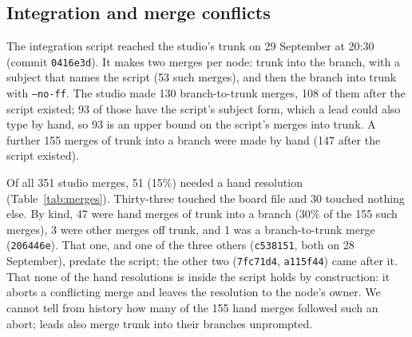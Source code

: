 \documentclass[11pt]{article}
\newcommand{\code}[1]{\texttt{#1}}
\begin{document}
\subsection{Integration and merge conflicts}

The integration script reached the studio's trunk on 29 September at 20:30 (commit %
\code{0416e3d}). It makes two merges per node: trunk into the branch, with a subject that
names the script (53 such merges), and then the branch into trunk with \code{--no-ff}. %
The studio made 130 branch-to-trunk merges, 108 of them after the script existed; 93 of %
those have the script's subject form, which a lead could also type by hand, so 93 is an
upper bound on the script's merges into trunk. A further 155 merges of trunk into a branch %
were made by hand (147 after the script existed).

Of all 351 studio merges, 51 (15\%) needed a hand resolution (Table~\ref{tab:merges}). %
Thirty-three touched the board file and 30 touched nothing else. By kind, 47 were hand %
merges of trunk into a branch (30\% of the 155 such merges), 3 were other merges off %
trunk, and 1 was a branch-to-trunk merge (\code{206446e}). That one, and one of the %
three others (\code{c538151}, both on 28 September), predate the script; the other two
(\code{7fc71d4}, \code{a115f44}) came after it. That none of the hand resolutions is
inside the script holds by construction: it aborts a conflicting merge and leaves the
resolution to the node's owner. We cannot tell from history how many of the 155 hand
merges followed such an abort; leads also merge trunk into their branches unprompted.
\end{document}
